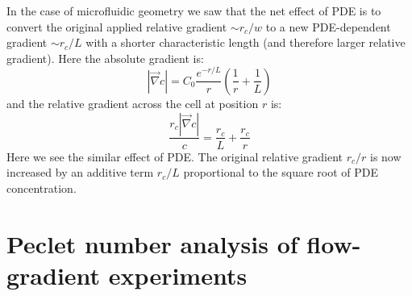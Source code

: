 \documentclass[10pt]{article}
\begin{document}
In the case of microfluidic geometry we saw that the net effect of PDE is to convert the original applied relative gradient $\sim r_c/w$ to a new PDE-dependent gradient $\sim r_c/L$ with a shorter characteristic length (and therefore larger relative gradient). Here the absolute gradient is:
\begin{equation}
	|\vec{\nabla}c| = C_0\frac{e^{-r/L}}{r}\left(\frac{1}{r} + \frac{1}{L}\right)
\end{equation}
and the relative gradient across the cell at position $r$ is:
\begin{equation}
	\frac{r_c |\vec{\nabla}c|}{c} = \frac{r_c}{L} + \frac{r_c}{r}
\end{equation}
Here we see the similar effect of PDE. The original relative gradient $r_c/r$ is now increased by an additive term $r_c/L$ proportional to the square root of PDE concentration.

	

%
%




\section{Peclet number analysis of  flow-gradient experiments}
\end{document}
